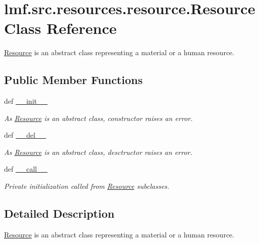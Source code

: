 \hypertarget{classlmf_1_1src_1_1resources_1_1resource_1_1_resource}{\section{lmf.\+src.\+resources.\+resource.\+Resource Class Reference}
\label{classlmf_1_1src_1_1resources_1_1resource_1_1_resource}
}


\hyperlink{classlmf_1_1src_1_1resources_1_1resource_1_1_resource}{Resource} is an abstract class representing a material or a human resource.  


\subsection*{Public Member Functions}
\begin{DoxyCompactItemize}
\item 
def \hyperlink{classlmf_1_1src_1_1resources_1_1resource_1_1_resource_adf841a9c1edc70040858112b7f144e3f}{\+\_\+\+\_\+init\+\_\+\+\_\+}
\begin{DoxyCompactList}\small\item\em As \hyperlink{classlmf_1_1src_1_1resources_1_1resource_1_1_resource}{Resource} is an abstract class, constructor raises an error. \end{DoxyCompactList}\item 
def \hyperlink{classlmf_1_1src_1_1resources_1_1resource_1_1_resource_af3f1ceb63eb841d5bc2ce20df9c74d7a}{\+\_\+\+\_\+del\+\_\+\+\_\+}
\begin{DoxyCompactList}\small\item\em As \hyperlink{classlmf_1_1src_1_1resources_1_1resource_1_1_resource}{Resource} is an abstract class, desctructor raises an error. \end{DoxyCompactList}\item 
def \hyperlink{classlmf_1_1src_1_1resources_1_1resource_1_1_resource_ae969204ff849acf51dcb4ae522d8914d}{\+\_\+\+\_\+call\+\_\+\+\_\+}
\begin{DoxyCompactList}\small\item\em Private initialization called from \hyperlink{classlmf_1_1src_1_1resources_1_1resource_1_1_resource}{Resource} subclasses. \end{DoxyCompactList}\end{DoxyCompactItemize}


\subsection{Detailed Description}
\hyperlink{classlmf_1_1src_1_1resources_1_1resource_1_1_resource}{Resource} is an abstract class representing a material or a human resource. 

